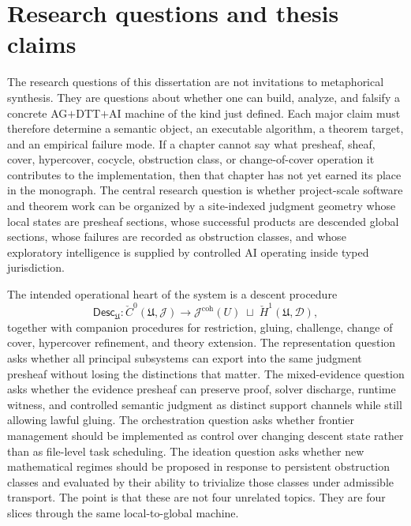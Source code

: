\documentclass[11pt]{report}
\begin{document}
\chapter{Research questions and thesis claims}
The research questions of this dissertation are not invitations to metaphorical synthesis. They are questions about whether one can build, analyze, and falsify a concrete AG$+$DTT$+$AI machine of the kind just defined. Each major claim must therefore determine a semantic object, an executable algorithm, a theorem target, and an empirical failure mode. If a chapter cannot say what presheaf, sheaf, cover, hypercover, cocycle, obstruction class, or change-of-cover operation it contributes to the implementation, then that chapter has not yet earned its place in the monograph. The central research question is whether project-scale software and theorem work can be organized by a site-indexed judgment geometry whose local states are presheaf sections, whose successful products are descended global sections, whose failures are recorded as obstruction classes, and whose exploratory intelligence is supplied by controlled AI operating inside typed jurisdiction.

The intended operational heart of the system is a descent procedure
\[
\mathsf{Desc}_{\mathfrak{U}} :
\check{C}^{0}(\mathfrak{U},\mathscr{J})
\longrightarrow
\mathscr{J}^{\mathrm{coh}}(U)\;\sqcup\;\check{H}^{1}(\mathfrak{U},\mathscr{D}),
\]
together with companion procedures for restriction, gluing, challenge, change of cover, hypercover refinement, and theory extension. The representation question asks whether all principal subsystems can export into the same judgment presheaf without losing the distinctions that matter. The mixed-evidence question asks whether the evidence presheaf can preserve proof, solver discharge, runtime witness, and controlled semantic judgment as distinct support channels while still allowing lawful gluing. The orchestration question asks whether frontier management should be implemented as control over changing descent state rather than as file-level task scheduling. The ideation question asks whether new mathematical regimes should be proposed in response to persistent obstruction classes and evaluated by their ability to trivialize those classes under admissible transport. The point is that these are not four unrelated topics. They are four slices through the same local-to-global machine.
\end{document}
